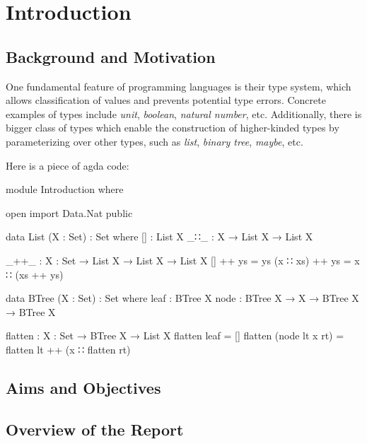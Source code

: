 \chapter{Introduction}

\section{Background and Motivation}

One fundamental feature of programming languages is their type system, which allows classification of values and prevents potential type errors. Concrete examples of types include \textit{unit}, \textit{boolean}, \textit{natural number}, etc. Additionally, there is bigger class of types which enable the construction of higher-kinded types by parameterizing over other types, such as \textit{list}, \textit{binary tree}, \textit{maybe}, etc.

Here is a piece of agda code:

\begin{code}[hide]
module Introduction where
  
open import Data.Nat public
\end{code}

\AgdaTarget{[]}
\begin{code}
data List (X : Set) : Set where
  []  : List X
  _∷_ : X → List X → List X  
\end{code}

\AgdaTarget{++, \_++\_}
\begin{code}
_++_ : {X : Set} → List X → List X → List X
[] ++ ys = ys
(x ∷ xs) ++ ys = x ∷ (xs ++ ys)
\end{code}

\begin{code}
data BTree (X : Set) : Set where
  leaf : BTree X
  node : BTree X → X → BTree X → BTree X
\end{code}

\begin{code}
flatten : {X : Set} → BTree X → List X
flatten leaf = []
flatten (node lt x rt) = flatten lt ++ (x ∷ flatten rt)
\end{code}

\section{Aims and Objectives}

\section{Overview of the Report}

